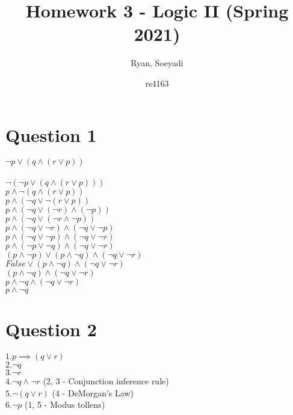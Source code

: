 \documentclass{article}
\title{Homework 3 - Logic II (Spring 2021)}
\author
{
Ryan, Soeyadi
\and rs4163
}
\begin{document}
    \maketitle
    
    \section*{Question 1}
    $\neg p \lor (q \land (r \lor p))$\\ \\
    $\neg (\neg p \lor (q \land (r \lor p)))$ \\
    $p \land \neg(q \land (r \lor p))$ \\
    $p \land (\neg q \lor \neg(r \lor p))$ \\
    $p \land (\neg q \lor (\neg r) \land (\neg p))$ \\
    $p \land (\neg q \lor (\neg r \land \neg p))$ \\
    $p \land (\neg q \lor \neg r) \land (\neg q \lor \neg p)$ \\
    $p \land (\neg q \lor \neg p) \land (\neg q \lor \neg r) $ \\
    $p \land (\neg p \lor \neg q) \land (\neg q \lor \neg r) $ \\
    $(p \land \neg p) \lor (p \land \neg q) \land (\neg q \lor \neg r)$ \\
    $False \lor (p \land \neg q) \land (\neg q \lor \neg r)$ \\
    $(p \land \neg q) \land (\neg q \lor \neg r)$ \\
    $p \land \neg q \land (\neg q \lor \neg r)$ \\
    $p \land \neg q$ \\
    \newpage
    \section*{Question 2}
    $1. p \implies (q \lor r)$ \\
    $2. \neg q$ \\
    $3. \neg r$ \\
    $4. \neg q \land \neg r$ (2, 3 - Conjunction inference rule) \\
    $5. \neg (q \lor r)$ (4 - DeMorgan's Law) \\
    $6. \neg p $ (1, 5 - Modus tollens) \\
    
    \newpage
\end{document}
